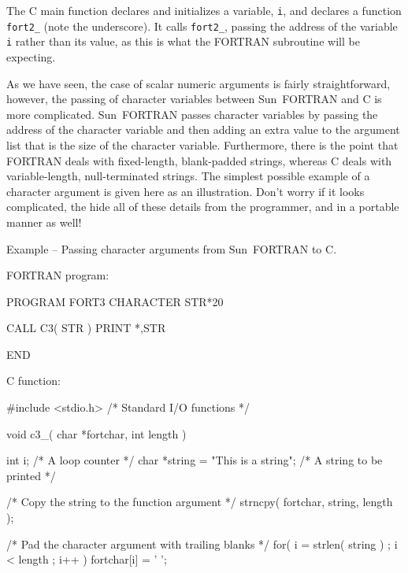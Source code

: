 \documentclass[twoside,11pt,nolof]{starlink}
\newcounter{examples}
\begin{document}
The C main function declares and initializes a variable, \texttt{i}, and declares
a function \texttt{fort2\_} (note the underscore). It calls \texttt{fort2\_}, passing
the address of the variable \texttt{i} rather than its value, as this is what the
FORTRAN subroutine will be expecting.

As we have seen, the case of scalar numeric arguments is fairly
straightforward, however, the passing of character variables between Sun~FORTRAN
and C is more complicated. Sun~FORTRAN passes character variables by passing the
address of the character variable and then adding an extra value to the
argument list that is the size of the character variable.  Furthermore, there
is the point that FORTRAN deals with fixed-length, blank-padded strings,
whereas C deals with variable-length, null-terminated strings. The simplest
possible example of a character argument is given here as an illustration.
Don't worry if it looks complicated, the
 hide all
of these details from the programmer, and in a portable manner as well!

\label{sun_char}
\begin{center}
Example\latex{~\ref{sun_char}}
-- Passing character arguments from Sun~FORTRAN to C\@.
\end{center}
\nopagebreak[4]
FORTRAN program:
\nopagebreak[4]
\begin{small}
\begin{terminalv}
      PROGRAM FORT3
      CHARACTER STR*20

      CALL C3( STR )
      PRINT *,STR

      END
\end{terminalv}
\end{small}
\pagebreak[1]
C function:
\nopagebreak[4]
\begin{small}
\begin{terminalv}
#include <stdio.h>                      /* Standard I/O functions */

void c3_( char *fortchar, int length )
{
  int  i;                              /* A loop counter */
  char  *string = "This is a string";  /* A string to be printed */

/* Copy the string to the function argument */
  strncpy( fortchar, string, length );

/* Pad the character argument with trailing blanks */
  for( i = strlen( string ) ; i < length ; i++ )
     fortchar[i] = ' ';
}
\end{terminalv}
\end{small}
\end{document}
